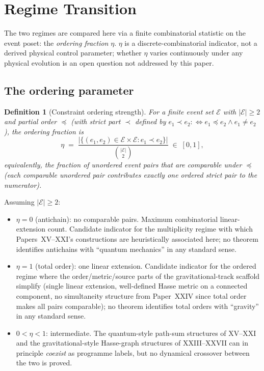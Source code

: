 \documentclass[12pt]{article}
\newtheorem{definition}[theorem]{Definition}
\newcommand{\Ecal}{\mathcal{E}}
\begin{document}
\section{Regime Transition}\label{sec:transition}

The two regimes are compared here via a finite combinatorial statistic on the event poset: the \textit{ordering fraction} $\eta$. $\eta$ is a discrete-combinatorial indicator, not a derived physical control parameter; whether $\eta$ varies continuously under any physical evolution is an open question not addressed by this paper.

\subsection{The ordering parameter}

\begin{definition}[Constraint ordering strength]\label{def:ordering}
For a finite event set $\Ecal$ with $|\Ecal| \ge 2$ and partial order $\preceq$ (with strict part $\prec$ defined by $e_1 \prec e_2 :\!\iff e_1 \preceq e_2 \wedge e_1 \neq e_2$), the \textit{ordering fraction} is
\begin{equation}
    \eta \;=\; \frac{|\{(e_1, e_2) \in \Ecal \times \Ecal : e_1 \prec e_2\}|}{\binom{|\Ecal|}{2}} \;\in\; [0, 1],
\end{equation}
equivalently, the fraction of unordered event pairs that are comparable under $\preceq$ (each comparable unordered pair contributes exactly one ordered strict pair to the numerator).
\end{definition}

Assuming $|\Ecal| \ge 2$:
\begin{itemize}
    \item $\eta = 0$ (antichain): no comparable pairs. Maximum combinatorial linear-extension count. Candidate indicator for the multiplicity regime with which Papers~XV--XXI's constructions are heuristically associated here; no theorem identifies antichains with ``quantum mechanics'' in any standard sense.
    \item $\eta = 1$ (total order): one linear extension. Candidate indicator for the ordered regime where the order/metric/source parts of the gravitational-track scaffold simplify (single linear extension, well-defined Hasse metric on a connected component, no simultaneity structure from Paper~XXIV since total order makes all pairs comparable); no theorem identifies total orders with ``gravity'' in any standard sense.
    \item $0 < \eta < 1$: intermediate. The quantum-style path-sum structures of XV--XXI and the gravitational-style Hasse-graph structures of XXIII--XXVII can in principle \emph{coexist} as programme labels, but no dynamical crossover between the two is proved.
\end{itemize}
\end{document}
